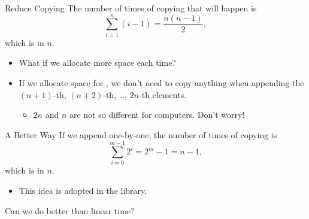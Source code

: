 \documentclass{beamer}
\begin{document}
\begin{frame}{Reduce Copying}
    The number of times of copying that will happen is
    \[\sum_{i=1}^n(i-1)=\frac{n(n-1)}2,\]
    which is  in \(n\). 
    \pause
    \begin{itemize}
        \item What if we allocate more space each time?
        \pause
        \item If we allocate space for , we don't need to copy anything when appending the \((n+1)\)-th, \((n+2)\)-th, \dots, \(2n\)-th elements.
        \pause
        \begin{itemize}
            \item \(2n\) and \(n\) are not so different for computers. Don't worry!
        \end{itemize}
    \end{itemize}
\end{frame}

\begin{frame}{A Better Way}
    If we append  one-by-one, the number of times of copying is
    \[\sum_{i=0}^{m-1}2^i=2^m-1=n-1,\]
    which is  in \(n\).
    \begin{itemize}
        \item This idea is adopted in the  library.
    \end{itemize}
    \pause
    \begin{question}
        Can we do better than linear time?
    \end{question}
\end{frame}
\end{document}
